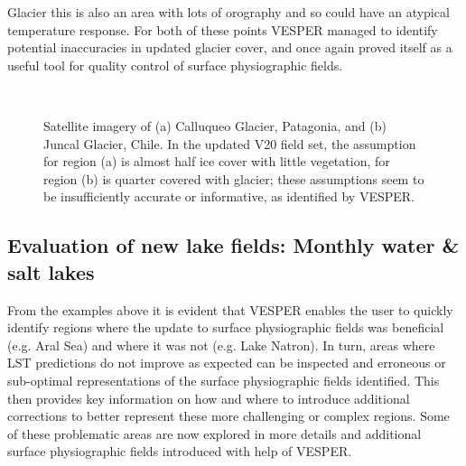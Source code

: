 \documentclass[hess, twostagejnl]{copernicus}
\begin{document}
Glacier this is also an area with lots of orography and so could have an atypical temperature response. For both of these points VESPER managed  to identify potential inaccuracies in updated glacier cover, and once again proved itself as a useful tool for quality control of surface physiographic fields. 
	\begin{figure}[h!]
	 \\
	\caption{Satellite imagery of (a) Calluqueo Glacier, Patagonia, and (b) Juncal Glacier, Chile. In the updated V20 field set, the assumption for region (a) is almost half ice cover with little vegetation, for region (b) is quarter covered with glacier; these assumptions seem to be insufficiently accurate or informative, as identified by VESPER.
	} 
	\label{fig:glacier}
\end{figure}

\subsection{Evaluation of new lake fields: Monthly water \& salt lakes}
From  the examples  above  it  is  evident  that  VESPER  enables  the  user  to  quickly  identify  regions  where  the  update  to  surface physiographic fields was beneficial (e.g. Aral Sea) and where it was not (e.g. Lake Natron). In turn, areas where LST predictions do not improve as expected can be inspected and erroneous or sub-optimal representations of the surface  physiographic  fields  identified.  This  then  provides  key  information  on  how  and  where  to  introduce  additional corrections to better represent these more challenging or complex regions. Some of these problematic areas are now explored in more details and additional surface physiographic fields introduced with help of VESPER. \newline 
\end{document}
